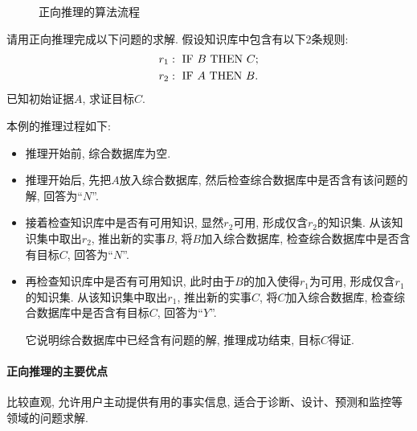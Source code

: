 \begin{figure}[H]
\begin{center}
    \vspace{-0.2cm}
    \caption{正向推理的算法流程}
    \label{AI32fig12}
\end{center}
\end{figure}
\begin{example}
请用正向推理完成以下问题的求解. 假设知识库中包含有以下2条规则:
\begin{align*}
            &r_1: \,\,   \textup{IF}\,\,     B\,\,     \textup{THEN}\,\,     C;\\
            &r_2: \,\,   \textup{IF}\,\,     A\,\,     \textup{THEN}\,\,     B.
\end{align*}
已知初始证据$A$, 求证目标$C$.
\end{example}
\begin{result}
本例的推理过程如下:
\begin{itemize}
\item 推理开始前, 综合数据库为空.
\item 推理开始后, 先把$A$放入综合数据库, 然后检查综合数据库中是否含有该问题的解, 回答为“$N$”.
\item 接着检查知识库中是否有可用知识, 显然$r_2$可用, 形成仅含$r_2$的知识集. 从该知识集中取出$r_2$, 推出新的实事$B$, 将$B$加入综合数据库, 检查综合数据库中是否含有目标$C$, 回答为“$N$”.
\item 再检查知识库中是否有可用知识, 此时由于$B$的加入使得$r_1$为可用, 形成仅含$r_1$的知识集. 从该知识集中取出$r_1$, 推出新的实事$C$, 将$C$加入综合数据库, 检查综合数据库中是否含有目标$C$, 回答为“$Y$”.

它说明综合数据库中已经含有问题的解, 推理成功结束, 目标$C$得证.
\end{itemize}
\end{result}
\paragraph{正向推理的主要优点}
比较直观, 允许用户主动提供有用的事实信息, 适合于诊断、设计、预测和监控等领域的问题求解.
